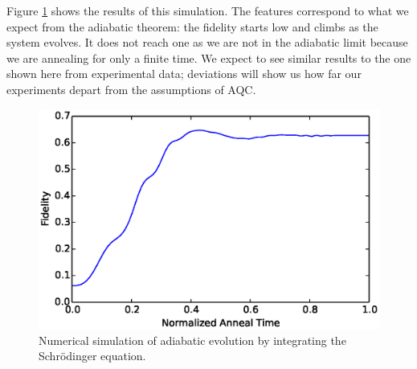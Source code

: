 Figure \ref{fig:simulate} shows the results of this simulation.  The features correspond to what we expect from the adiabatic theorem: the fidelity starts low and climbs as the system evolves.  It does not reach one as we are not in the adiabatic limit because we are annealing for only a finite time.  We expect to see similar results to the one shown here from experimental data; deviations will show us how far our experiments depart from the assumptions of AQC.
\begin{figure}
	\includegraphics{img/simulate.eps}
	\caption[Simulated AQC]{Numerical simulation of adiabatic evolution by integrating the Schr\"odinger equation.}
	\label{fig:simulate}
\end{figure}
